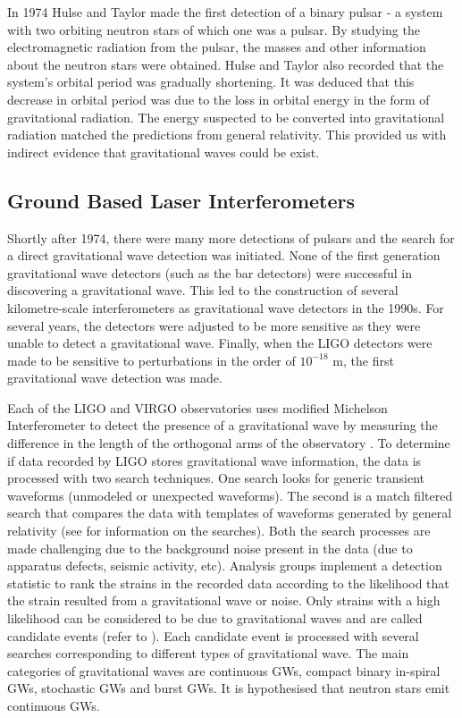 \documentclass[%
reprint,
amsmath,amssymb,
aps,
]{revtex4-1}
\begin{document}
	In 1974 Hulse and Taylor made the first detection of a binary pulsar - a system with two orbiting neutron stars of which one was a pulsar. By studying the electromagnetic radiation from the pulsar, the masses and other information about the neutron stars were obtained. Hulse and Taylor also recorded that the system's orbital period was gradually shortening. It was deduced that this decrease in orbital period was due to the loss in orbital energy in the form of gravitational radiation. The energy suspected to be converted into gravitational radiation matched the predictions from general relativity. This provided us with indirect evidence that gravitational waves could be exist. 
	
	
	\subsection{Ground Based Laser Interferometers}
	
	Shortly after 1974, there were many more detections of pulsars and the search for a direct gravitational wave detection was initiated. None of the first generation gravitational wave detectors (such as the bar detectors) were successful in discovering a gravitational wave. This led to the construction of several kilometre-scale interferometers as gravitational wave detectors in the 1990s. For several years, the detectors were adjusted to be more sensitive as they were unable to detect a gravitational wave. Finally, when the LIGO detectors were made to be sensitive to perturbations in the order of $10^{−18}$ m, the first gravitational wave detection was made.
	
	Each of the LIGO and VIRGO observatories uses modified Michelson Interferometer to detect the presence of a gravitational wave by measuring the difference in the length of the orthogonal arms of the observatory \cite{DetectionPaper}. To determine if data recorded by LIGO stores gravitational wave information, the data is processed with two search techniques. One search looks for generic transient waveforms (unmodeled or unexpected waveforms). The second is a match filtered search that compares the data with templates of waveforms generated by general relativity (see \cite{ligo2016properties} for information on the searches). Both the search processes are made challenging due to the background noise present in the data (due to apparatus defects, seismic activity, etc)\cite{RSmith}. Analysis groups implement a detection statistic to rank the strains in the recorded data according to the likelihood that the strain resulted from a gravitational wave or noise. Only strains with a high likelihood can be considered to be due to gravitational waves and are called candidate events (refer to \cite{DetectionPaper}). Each candidate event is processed with several searches corresponding to different types of gravitational wave. The main categories of gravitational waves are continuous GWs, compact binary in-spiral GWs, stochastic GWs and burst GWs. It is hypothesised that neutron stars emit continuous GWs. 
	
\end{document}
